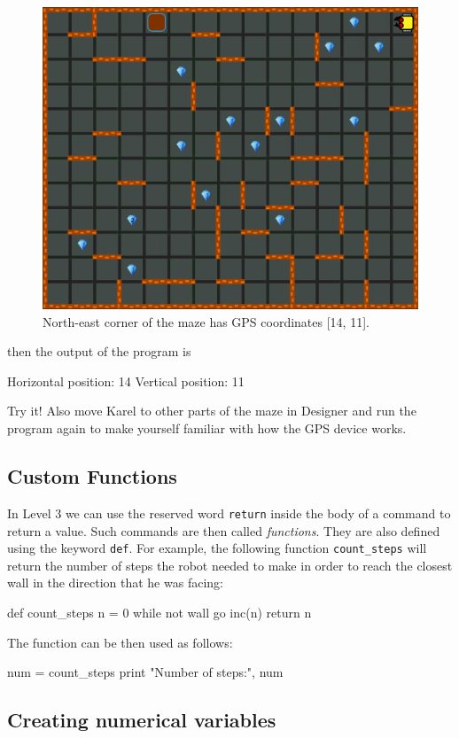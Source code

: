 \begin{figure}[!ht]
\begin{center}
\includegraphics[height=0.4\textwidth]{imgk/gps-101.png}
\vspace{-0mm}
\caption{North-east corner of the maze has GPS coordinates [14, 11].}
\label{fig:gps-101}
\end{center}
\end{figure}
\newpage
\noindent
then the output of the program is

\begin{greencode}
Horizontal position: 14
Vertical position: 11
\end{greencode}
Try it! Also move Karel to other parts of the maze in Designer and run the program again
to make yourself familiar with how the GPS device works.

\subsection{Custom Functions}

In Level 3 we can use the reserved word {\tt return} inside the body of
a command to return a value. Such commands are then called {\em functions}. 
They are also defined using the keyword {\tt def}. For example, the following function
{\tt count\_steps} will return the number of steps the robot needed to 
make in order to reach the closest wall in the direction that he was facing:

\begin{bluecode}
def count_steps
    n = 0
    while not wall
        go
        inc(n)
    return n
\end{bluecode}
The function can be then used as follows:

\begin{bluecode}
num = count_steps
print "Number of steps:", num 
\end{bluecode}

\subsection{Creating numerical variables} \label{par:var}

